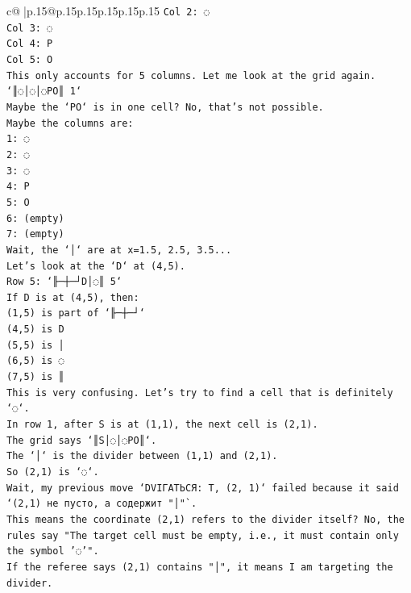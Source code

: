 \documentclass{article}
\begin{document}
{\begin{supertabular}{c@{$\;$}|p{.15\linewidth}@{}p{.15\linewidth}p{.15\linewidth}p{.15\linewidth}p{.15\linewidth}p{.15\linewidth}}
{{{\texttt{Col 2: ◌} \\
\texttt{Col 3: ◌} \\
\texttt{Col 4: P} \\
\texttt{Col 5: O} \\
\texttt{This only accounts for 5 columns. Let me look at the grid again.} \\
\texttt{`║◌│◌│◌PO║ 1`} \\
\texttt{Maybe the `PO` is in one cell? No, that's not possible.} \\
\texttt{Maybe the columns are:} \\
\texttt{1: ◌} \\
\texttt{2: ◌} \\
\texttt{3: ◌} \\
\texttt{4: P} \\
\texttt{5: O} \\
\texttt{6: (empty)} \\
\texttt{7: (empty)} \\
\texttt{Wait, the `│` are at x=1.5, 2.5, 3.5...} \\
\texttt{Let's look at the `D` at (4,5).} \\
\texttt{Row 5: `╟─┼─┘D│◌║ 5`} \\
\texttt{If D is at (4,5), then:} \\
\texttt{(1,5) is part of `╟─┼─┘`} \\
\texttt{(4,5) is D} \\
\texttt{(5,5) is │} \\
\texttt{(6,5) is ◌} \\
\texttt{(7,5) is ║} \\
\texttt{This is very confusing. Let's try to find a cell that is definitely `◌`.} \\
\texttt{In row 1, after S is at (1,1), the next cell is (2,1).} \\
\texttt{The grid says `║S│◌│◌PO║`.} \\
\texttt{The `│` is the divider between (1,1) and (2,1).} \\
\texttt{So (2,1) is `◌`.} \\
\texttt{Wait, my previous move `DVIГАТЬСЯ: T, (2, 1)` failed because it said `(2,1) не пусто, а содержит "│"`.} \\
\texttt{This means the coordinate (2,1) refers to the divider itself? No, the rules say "The target cell must be empty, i.e., it must contain only the symbol '◌'".} \\
\texttt{If the referee says (2,1) contains "│", it means I am targeting the divider.} \\
}}}
\end{supertabular}}
\end{document}
